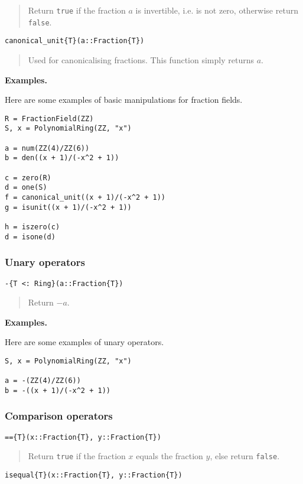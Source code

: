 \documentclass[a4paper,10pt]{article}
\newcommand{\code}{\lstinline}
\newcommand{\desc}[1]{\vspace{-3mm}\begin{quote}#1\end{quote}}
\begin{document}
{{\desc{Return \code{true} if the fraction $a$ is invertible, i.e. is not zero,
otherwise return \code{false}.}

\begin{lstlisting}
canonical_unit{T}(a::Fraction{T})
\end{lstlisting}

\desc{Used for canonicalising fractions. This function simply returns $a$.}

\textbf{Examples.}

Here are some examples of basic manipulations for fraction fields.

\begin{lstlisting}
R = FractionField(ZZ)
S, x = PolynomialRing(ZZ, "x")

a = num(ZZ(4)/ZZ(6))
b = den((x + 1)/(-x^2 + 1))

c = zero(R)
d = one(S)
f = canonical_unit((x + 1)/(-x^2 + 1))
g = isunit((x + 1)/(-x^2 + 1))

h = iszero(c)
d = isone(d)
\end{lstlisting}

\subsubsection{Unary operators}

\begin{lstlisting}
-{T <: Ring}(a::Fraction{T})
\end{lstlisting}

\desc{Return $-a$.}

\textbf{Examples.}

Here are some examples of unary operators.

\begin{lstlisting}
S, x = PolynomialRing(ZZ, "x")

a = -(ZZ(4)/ZZ(6))
b = -((x + 1)/(-x^2 + 1))
\end{lstlisting}

\subsubsection{Comparison operators}

\begin{lstlisting}
=={T}(x::Fraction{T}, y::Fraction{T})
\end{lstlisting}

\desc{Return \code{true} if the fraction $x$ equals the fraction $y$, else
return \code{false}.}

\begin{lstlisting}
isequal{T}(x::Fraction{T}, y::Fraction{T})
\end{lstlisting}

}}
\end{document}
